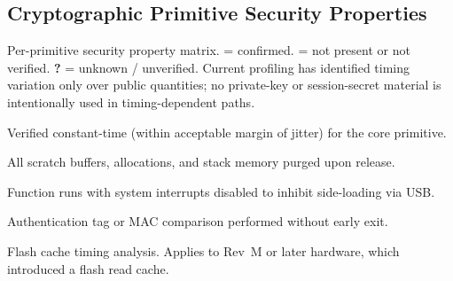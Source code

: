\documentclass[titlepage]{report}
\begin{document}
	\newpage
	\subsection{Cryptographic Primitive Security Properties}\label{ssec:crypto_properties}

	Per-primitive security property matrix. \textbf{\checkmark} = confirmed. \textbf{\texttimes} = not present or not verified. \textbf{?} = unknown / unverified. Current profiling has identified timing variation only over public quantities; no private-key or session-secret material is intentionally used in timing-dependent paths.

	\begin{description}[leftmargin=0pt,labelwidth=\widthof{\textbf{Cache Safe: }},align=left,nosep]
		\item[\textbf{CT:}] Verified constant-time (within acceptable margin of jitter) for the core primitive.
		\item[\textbf{Zeroed:}] All scratch buffers, allocations, and stack memory purged upon release.
		\item[\textbf{IRQ-Gated:}] Function runs with system interrupts disabled to inhibit side-loading via USB.
		\item[\textbf{CT Tag Cmp:}] Authentication tag or MAC comparison performed without early exit.
		\item[\textbf{Cache Safe:}] Flash cache timing analysis. Applies to Rev~M or later hardware, which introduced a flash read cache.
	\end{description}

	\vspace{0.5em}

	\newcommand{\yes}{\checkmark}
	\newcommand{\no}{\texttimes}
	\newcommand{\unk}{?}
\end{document}

